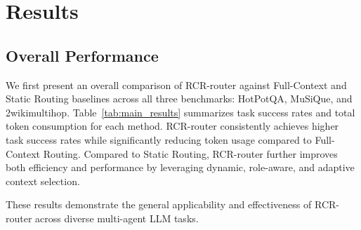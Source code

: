 \documentclass[letterpaper]{article} %
\begin{document}

\section{Results}
\subsection{Overall Performance}

We first present an overall comparison of RCR-router against Full-Context and Static Routing baselines across all three benchmarks: HotPotQA, MuSiQue, and 2wikimultihop. 
%
Table~\ref{tab:main_results} summarizes task success rates and total token consumption for each method. RCR-router consistently achieves higher task success rates while significantly reducing token usage compared to Full-Context Routing. Compared to Static Routing, RCR-router further improves both efficiency and performance by leveraging dynamic, role-aware, and adaptive context selection.

These results demonstrate the general applicability and effectiveness of RCR-router across diverse multi-agent LLM tasks.
\end{document}
